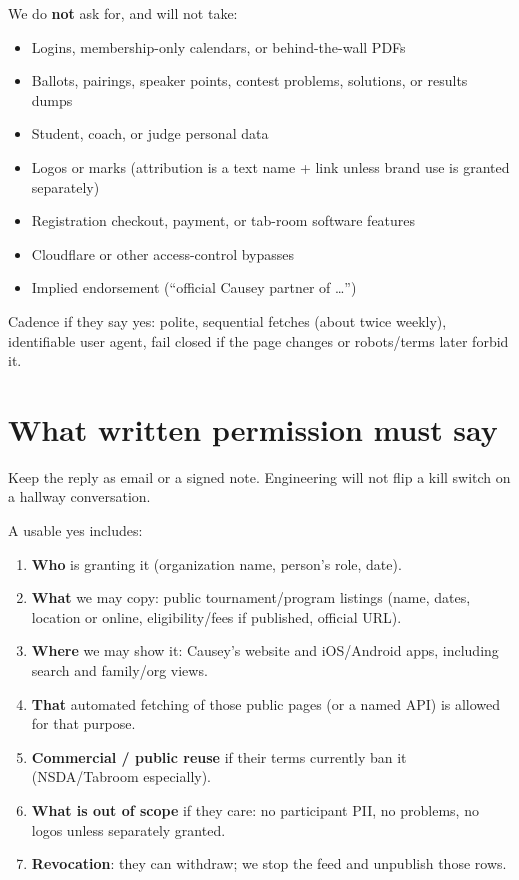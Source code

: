 \documentclass[11pt]{article}
\begin{document}
We do \textbf{not} ask for, and will not take:

\begin{itemize}
  \item Logins, membership-only calendars, or behind-the-wall PDFs
  \item Ballots, pairings, speaker points, contest problems, solutions, or results dumps
  \item Student, coach, or judge personal data
  \item Logos or marks (attribution is a text name + link unless brand use is granted separately)
  \item Registration checkout, payment, or tab-room software features
  \item Cloudflare or other access-control bypasses
  \item Implied endorsement (``official Causey partner of \ldots'')
\end{itemize}

Cadence if they say yes: polite, sequential fetches (about twice weekly), identifiable user agent, fail closed if the page changes or robots/terms later forbid it.

\section*{What written permission must say}

Keep the reply as email or a signed note. Engineering will not flip a kill switch on a hallway conversation.

A usable yes includes:

\begin{enumerate}
  \item \textbf{Who} is granting it (organization name, person's role, date).
  \item \textbf{What} we may copy: public tournament/program listings (name, dates, location or online, eligibility/fees if published, official URL).
  \item \textbf{Where} we may show it: Causey's website and iOS/Android apps, including search and family/org views.
  \item \textbf{That} automated fetching of those public pages (or a named API) is allowed for that purpose.
  \item \textbf{Commercial / public reuse} if their terms currently ban it (NSDA/Tabroom especially).
  \item \textbf{What is out of scope} if they care: no participant PII, no problems, no logos unless separately granted.
  \item \textbf{Revocation}: they can withdraw; we stop the feed and unpublish those rows.
\end{enumerate}
\end{document}
